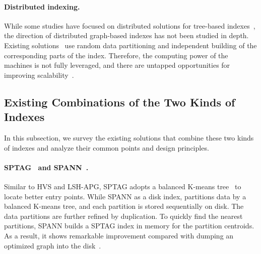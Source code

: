 \documentclass[11pt]{article}
\begin{document}
\paragraph{Distributed indexing.}
While some studies have focused on distributed solutions for tree-based indexes~\cite{dpisax,tardis,parrot,odyssey}, the direction of distributed graph-based indexes has not been studied in depth. 
Existing solutions~\cite{milvus,nsg} use random data partitioning and independent building of the corresponding parts of the index.
Therefore, the computing power of the machines is not fully leveraged, and there are untapped opportunities for improving scalability~\cite{pyramid,leqat}.







\subsection{Existing Combinations of the Two Kinds of Indexes}
\label{zeyu_sec:combination}

In this subsection, we survey the existing solutions that combine these two kinds of indexes and analyze their common points and design principles.

\paragraph{SPTAG~\cite{sptag} and SPANN~\cite{spann}.}
Similar to HVS and LSH-APG, SPTAG adopts a balanced K-means tree~\cite{bkt} to locate better entry points.
While SPANN as a disk index, partitions data by a balanced K-means tree, and each partition is stored sequentially on disk.
The data partitions are further refined by duplication.
To quickly find the nearest partitions, SPANN builds a SPTAG index in memory for the partition centroids.
As a result, it shows remarkable improvement compared with dumping an optimized graph into the disk~\cite{diskann}.
\end{document}

